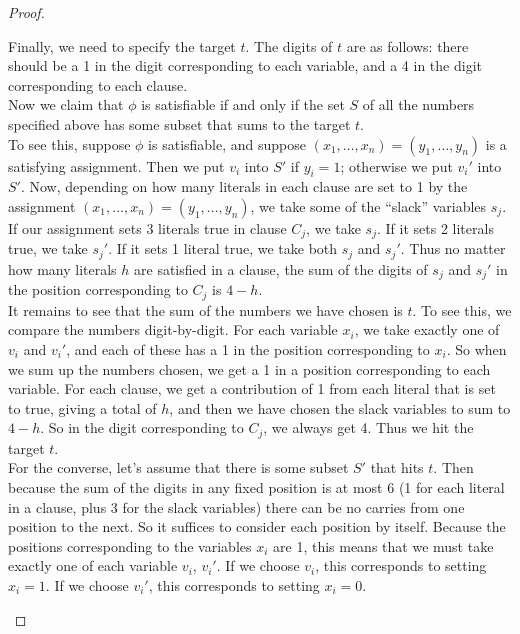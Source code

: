 \documentclass[12pt]{article}
\theoremstyle{plain}
\theoremstyle{definition}
\begin{document}
\begin{proof}
\begin{enumerate}
  Finally, we need to specify the target $t$.
  The digits of $t$ are as follows: there should be a 1 in the digit corresponding to each variable, and a 4 in the digit corresponding to each clause. \\

  Now we claim that $\phi$ is satisfiable if and only if the set $S$ of all the numbers specified above has some subset that sums to the target $t$. \\

  To see this, suppose $\phi$ is satisfiable, and suppose $(x_{1}, \dots, x_{n}) = (y_{1}, \dots, y_{n})$ is a satisfying assignment.
  Then we put $v_{i}$ into $S'$ if $y_{i} = 1$;
  otherwise we put $v_{i}'$ into $S'$.
  Now, depending on how many literals in each clause are set to 1 by the assignment $(x_{1}, \dots, x_{n}) = (y_{1}, \dots, y_{n})$, we take some of the ``slack'' variables $s_{j}$.
  If our assignment sets 3 literals true in clause $C_{j}$, we take $s_{j}$.
  If it sets 2 literals true, we take $s_{j}'$.
  If it sets 1 literal true, we take both $s_{j}$ and $s_{j}'$.
  Thus no matter how many literals $h$ are satisfied in a clause, the sum of the digits of $s_{j}$ and $s_{j}'$ in the position corresponding to $C_{j}$ is $4 - h$. \\

  It remains to see that the sum of the numbers we have chosen is $t$.
  To see this, we compare the numbers digit-by-digit.
  For each variable $x_{i}$, we take exactly one of $v_{i}$ and $v_{i}'$, and each of these has a 1 in the position corresponding to $x_{i}$.
  So when we sum up the numbers chosen, we get a 1 in a position corresponding to each variable.
  For each clause, we get a contribution of 1 from each literal that is set to true, giving a total of $h$, and then we have chosen the slack variables to sum to $4-h$.
  So in the digit corresponding to $C_{j}$, we always get 4.
  Thus we hit the target $t$. \\

  For the converse, let's assume that there is some subset $S'$ that hits $t$.
  Then because the sum of the digits in any fixed position is at most 6 (1 for each literal in a clause, plus 3 for the slack variables) there can be no carries from one position to the next.
  So it suffices to consider each position by itself.
  Because the positions corresponding to the variables $x_{i}$ are 1, this means that we must take exactly one of each variable $v_{i}$, $v_{i}'$.
  If we choose $v_{i}$, this corresponds to setting $x_{i} = 1$.
  If we choose $v_{i}'$, this corresponds to setting $x_{i} = 0$. \\


\end{enumerate}
\end{proof}
\end{document}
